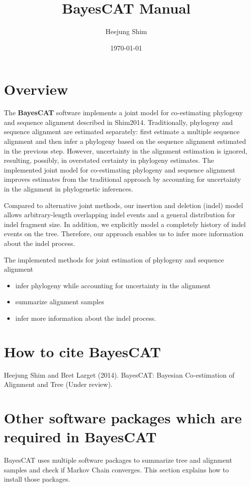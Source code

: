 \documentclass[11pt]{article}
\author{Heejung Shim}
\date{\today}
\title{BayesCAT Manual}
\begin{document}
\maketitle
\tableofcontents


\section{Overview}
\label{sec-1}
The \textbf{BayesCAT} software implements a joint model for co-estimating phylogeny and sequence alignment described in Shim2014. Traditionally, phylogeny and sequence alignment are estimated separately: first estimate a multiple sequence alignment and then infer a phylogeny based on the sequence alignment estimated in the previous step. However, uncertainty in the alignment estimation is ignored, resulting, possibly, in overstated certainty in phylogeny estimates. The implemented joint model for co-estimating phylogeny and sequence alignment improves estimates from the traditional approach by accounting for uncertainty in the alignment in phylogenetic inferences. 

Compared to alternative joint methods, our insertion and deletion (indel) model allows arbitrary-length overlapping indel events and a general distribution for indel fragment size. In addition, we explicitly model a completely history of indel events on the tree. Therefore, our approach enables us to infer more information about the indel process.

The implemented methods for joint estimation of phylogeny and sequence alignment  
\begin{itemize}
\item infer phylogeny while accounting for uncertainty in the alignment
\item summarize alignment samples
\item infer more information about the indel process.
\end{itemize}

\section{How to cite BayesCAT}
\label{sec-2}
Heejung Shim and Bret Larget (2014). BayesCAT: Bayesian Co-estimation of Alignment and Tree (Under review).

\section{Other software packages which are required in BayesCAT}
\label{sec-3}
BayesCAT uses multiple software packages to summarize tree and alignment samples and check if Markov Chain converges. This section explains how to install those packages. 
\end{document}
